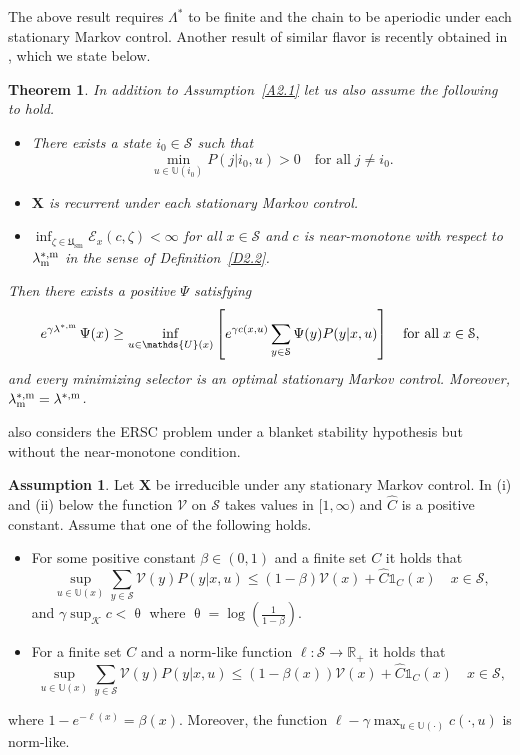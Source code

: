 \documentclass[notitlepage,11pt,reqno]{amsart}
\numberwithin{equation}{section}
\theoremstyle{plain}
\newtheorem{theorem}{Theorem}[section]
\theoremstyle{definition}
\newtheorem{assumption}{Assumption}[section]
\theoremstyle{remark}
\newcommand{\Ind}{\mathds{1}}       %
\newcommand{\Act}{{\mathds{U}}}
\newcommand{\sE}{{\mathscr{E}}}     %
\newcommand{\sK}{{\mathscr{K}}}
\newcommand{\cS}{{\mathcal{S}}}     %
\newcommand{\Lyap}{{\mathscr{V}}}   %
\newcommand{\Usm}{\mathfrak{U}_{\mathrm{sm}}}
\newcommand{\lamstrdm}{\lambda^{*,{\rm m}}}
\newcommand{\RR}{\mathds{R}} %
\begin{document}
The above result requires $\Lambda^*$ to be finite and the chain to be 
aperiodic under each stationary Markov control. Another result of similar
flavor is recently obtained in \cite{MR4429406}, which we state below.
\begin{theorem}\label{T2.6}
In addition to Assumption~\ref{A2.1} let us also assume the following to
hold.
\begin{itemize}
\item[\hypertarget{i}{(i)}] There exists a state $i_0\in\cS$ such that
$$\min_{u\in\Act(i_0)}P(j|i_0, u)>0\quad \text{for all}\; j\neq i_0.$$
\item[(ii)] $\textbf{X}$ is recurrent under each stationary Markov control.
\item[(iii)] $\inf_{\zeta\in\Usm}\sE_x(c, \zeta)<\infty$ for all $x\in\cS$
and $c$ is near-monotone with respect to $\lambda^{*,{\rm m}}_{\rm m}$ in the sense
of Definition~\ref{D2.2}.
\end{itemize}
Then there exists a positive $\Psi$ satisfying
\begin{equation*}
e^{\gamma\lamstrdm}\, \Psi(x)\geq \inf_{u\in\Act(x)} \left[e^{\gamma c(x, u)} \sum_{y\in\cS} \Psi(y) P(y|x, u)\right]\quad \text{for all}\; x\in \cS,
\end{equation*}
and every minimizing selector is an optimal stationary Markov control. Moreover, $\lambda^{*,{\rm m}}_{\rm m}=\lamstrdm$.
\end{theorem}
\cite{MR4429406} also considers the ERSC problem under a blanket stability 
hypothesis but without the near-monotone condition.
\begin{assumption}\label{A2.3}
Let $\textbf{X}$ be irreducible under any stationary Markov control.
In (i) and (ii) below the function $\Lyap$ on $\cS$ takes values in 
$[1, \infty)$ and $\widehat{C}$ is a positive
constant. Assume that one of the following holds.
\begin{itemize}
\item[(i)] For some positive constant $\beta\in (0,1)$ and a finite set 
$C$ it holds that
$$\sup_{u\in\Act(x)}\sum_{y\in\cS} \Lyap(y) P(y|x, u) \leq
(1-\beta)\Lyap(x) + \widehat{C}\Ind_C(x)\quad x\in\cS,$$
and $\gamma\sup_{\sK}c<\uptheta$ where $\uptheta=\log(\frac{1}{1-\beta})$.
\item[(ii)] For a finite set $C$ and a norm-like function $\ell:\cS\to\RR_+$
it holds that 
$$\sup_{u\in\Act(x)}\sum_{y\in\cS} \Lyap(y) P(y|x, u) \leq
(1-\beta(x))\Lyap(x) + \widehat{C}\Ind_C(x)\quad x\in\cS,$$
\end{itemize}
where $1-e^{-\ell(x)}=\beta(x)$. Moreover, the function
$\ell-\gamma\max_{u\in\Act(\cdot)} c(\cdot, u)$ is norm-like.
\end{assumption}
\end{document}
